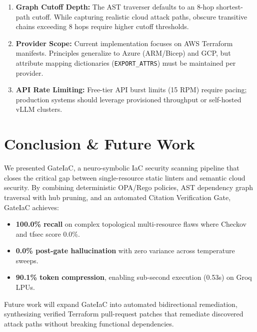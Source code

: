 \documentclass[conference]{IEEEtran}
\begin{document}
\begin{enumerate}
    \item \textbf{Graph Cutoff Depth:} The AST traverser defaults to an 8-hop shortest-path cutoff. While capturing realistic cloud attack paths, obscure transitive chains exceeding 8 hops require higher cutoff thresholds.
    \item \textbf{Provider Scope:} Current implementation focuses on AWS Terraform manifests. Principles generalize to Azure (ARM/Bicep) and GCP, but attribute mapping dictionaries (\texttt{EXPORT\_ATTRS}) must be maintained per provider.
    \item \textbf{API Rate Limiting:} Free-tier API burst limits (15 RPM) require pacing; production systems should leverage provisioned throughput or self-hosted vLLM clusters.
\end{enumerate}

\section{Conclusion \& Future Work}

We presented GateIaC, a neuro-symbolic IaC security scanning pipeline that closes the critical gap between single-resource static linters and semantic cloud security. By combining deterministic OPA/Rego policies, AST dependency graph traversal with hub pruning, and an automated Citation Verification Gate, GateIaC achieves:
\begin{itemize}
    \item \textbf{100.0\% recall} on complex topological multi-resource flaws where Checkov and tfsec score 0.0\%.
    \item \textbf{0.0\% post-gate hallucination} with zero variance across temperature sweeps.
    \item \textbf{90.1\% token compression}, enabling sub-second execution (0.53s) on Groq LPUs.
\end{itemize}

Future work will expand GateIaC into automated bidirectional remediation, synthesizing verified Terraform pull-request patches that remediate discovered attack paths without breaking functional dependencies.



\end{document}
